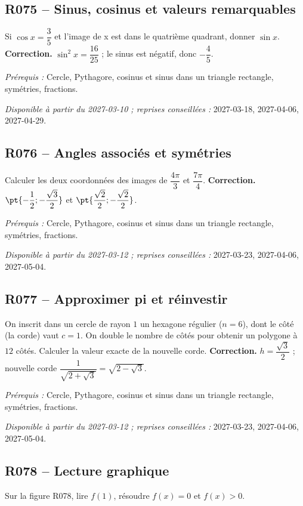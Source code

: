\subsection*{R075 -- Sinus, cosinus et valeurs remarquables}\label{R075}
Si $\cos x=\dfrac{3}{5}$ et l’image de x est dans le quatrième quadrant, donner $\sin x$.
\ifmxteacher\textbf{Correction.} $\sin ^2x=\dfrac{16}{25}$ ; le sinus est négatif, donc $-\dfrac{4}{5}$.\par\textit{Prérequis :} Cercle, Pythagore, cosinus et sinus dans un triangle rectangle, symétries, fractions.\par\textit{Disponible à partir du 2027-03-10 ; reprises conseillées :} 2027-03-18, 2027-04-06, 2027-04-29.\fi
{}\subsection*{R076 -- Angles associés et symétries}\label{R076}
Calculer les deux coordonnées des images de $\dfrac{4\pi}{3}$ et $\dfrac{7\pi}{4}$.
\ifmxteacher\textbf{Correction.} $\pt{-\dfrac{1}{2};-\dfrac{\sqrt 3}{2}}$ et $\pt{\dfrac{\sqrt 2}{2};-\dfrac{\sqrt 2}{2}}$.\par\textit{Prérequis :} Cercle, Pythagore, cosinus et sinus dans un triangle rectangle, symétries, fractions.\par\textit{Disponible à partir du 2027-03-12 ; reprises conseillées :} 2027-03-23, 2027-04-06, 2027-05-04.\fi
{}\subsection*{R077 -- Approximer pi et réinvestir}\label{R077}
On inscrit dans un cercle de rayon $1$ un hexagone régulier ($n=6$), dont le côté (la corde) vaut $c=1$. On double le nombre de côtés pour obtenir un polygone à $12$ côtés. Calculer la valeur exacte de la nouvelle corde.
\ifmxteacher\textbf{Correction.} $h=\dfrac{\sqrt 3}{2}$ ; nouvelle corde $\dfrac{1}{\sqrt {2+\sqrt3}}=\sqrt {2-\sqrt3}$.\par\textit{Prérequis :} Cercle, Pythagore, cosinus et sinus dans un triangle rectangle, symétries, fractions.\par\textit{Disponible à partir du 2027-03-12 ; reprises conseillées :} 2027-03-23, 2027-04-06, 2027-05-04.\fi
{}
\subsection*{R078 -- Lecture graphique}\label{R078}
Sur la figure R078, lire $f(1)$, résoudre $f(x)=0$ et $f(x)>0$.
